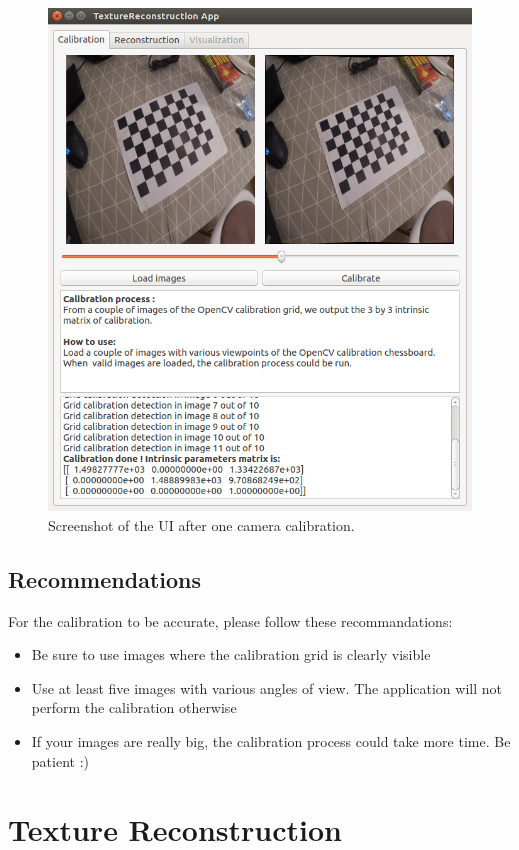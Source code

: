 \documentclass[12pt]{article}
\begin{document}
\begin{figure}[!ht]
    \centering
	\includegraphics[width=\linewidth]{img/calibrated}
\caption{Screenshot of the UI after one camera calibration.}
\label{fig:calibration}
\end{figure}

\subsection{Recommendations}
For the calibration to be accurate, please follow these recommandations:
\begin{itemize}
    \item Be sure to use images where the calibration grid is clearly visible
    \item Use at least five images with various angles of view. The application will not perform the calibration otherwise
    \item If your images are really big, the calibration process could take more time. Be patient :) 
\end{itemize}

\section{Texture Reconstruction}
\label{sec:texture}
\end{document}
